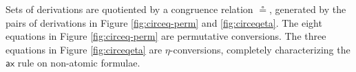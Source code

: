 \documentclass[sn-mathphys-num]{sn-jnl}%
\newcommand{\GG}{\Gamma}
\newcommand{\GD}{\Delta}
\newcommand{\tl}{\otimes \mathsf{L}}
\newcommand{\tr}{\otimes\mathsf{R}}
\newcommand{\pass}{\mathsf{pass}}
\newcommand{\unitl}{\mathsf{IL}}
\newcommand{\unitr}{\mathsf{IR}}
\newcommand{\ax}{\mathsf{ax}}
\newcommand{\ot}{\otimes}
\newcommand{\lolli}{\multimap}
\newcommand{\lleft}{{\lolli}\mathsf{L}}
\newcommand{\lright}{{\lolli}\mathsf{R}}
\newcommand{\unit}{\mathsf{I}}
\theoremstyle{thmstyleone}%
\theoremstyle{thmstyletwo}%
\theoremstyle{thmstylethree}%
\begin{document}
Sets of derivations are quotiented by a congruence relation $\circeq$, generated by the pairs of derivations in Figure \ref{fig:circeq-perm} and \ref{fig:circeqeta}.
The eight equations in Figure \ref{fig:circeq-perm} are permutative conversions.
The three equations in Figure \ref{fig:circeqeta} are $\eta$-conversions, completely characterizing the $\ax$ rule on non-atomic formulae. 
\end{document}
